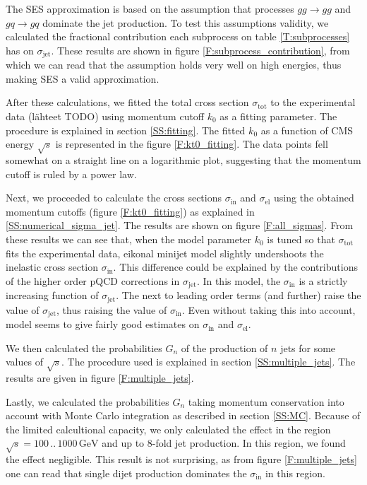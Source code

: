 \documentclass[a4paper, twoside, english, 12pt]{article}
\begin{document}
The SES approximation is based on the assumption that processes $gg\rightarrow gg$ and $gq\rightarrow gq$ dominate the jet production. To test this assumptions validity, we calculated the fractional contribution each subprocess on table \ref{T:subprocesses} has on $\sigma_{\text{jet}}$. These results are shown in figure \ref{F:subprocess_contribution}, from which we can read that the assumption holds very well on high energies, thus making SES a valid approximation.

After these calculations, we fitted the total cross section $\sigma_{\text{tot}}$ to the experimental data (lähteet TODO) using momentum cutoff $k_0$ as a fitting parameter. The procedure is explained in section \ref{SS:fitting}. The fitted $k_0$ as a function of CMS energy $\sqrt{s}$ is represented in the figure \ref{F:kt0_fitting}. The data points fell somewhat on a straight line on a logarithmic plot, suggesting that the momentum cutoff is ruled by a power law.

Next, we proceeded to calculate the cross sections $\sigma_{\text{in}}$ and $\sigma_{\text{el}}$ using the obtained momentum cutoffs (figure \ref{F:kt0_fitting}) as explained in \ref{SS:numerical_sigma_jet}. The results are shown on figure \ref{F:all_sigmas}. From these results we can see that, when the model parameter $k_0$ is tuned so that $\sigma_{\text{tot}}$ fits the experimental data, eikonal minijet model slightly undershoots the inelastic cross section $\sigma_{\text{in}}$. This difference could be explained by the contributions of the higher order pQCD corrections in $\sigma_{\text{jet}}$. In this model, the  $\sigma_{\text{in}}$ is a strictly increasing function of  $\sigma_{\text{jet}}$. The next to leading order terms (and further) raise the value of $\sigma_{\text{jet}}$, thus raising the value of $\sigma_{\text{in}}$. Even without taking this into account, model seems to give fairly good estimates on $\sigma_{\text{in}}$ and  $\sigma_{\text{el}}$.

We then calculated the probabilities $G_n$ of the production of $n$ jets for some values of $\sqrt{s}$. The procedure used is explained in section \ref{SS:multiple_jets}. The results are given in figure \ref{F:multiple_jets}.

Lastly, we calculated the probabilities $G_n$ taking momentum conservation into account with Monte Carlo integration as described in section \ref{SS:MC}. Because of the limited calcultional capacity, we only calculated the effect in the region $\sqrt{s}=100\,..\,1000\,\text{GeV}$ and up to 8-fold jet production. In this region, we found the effect negligible. This result is not surprising, as from figure \ref{F:multiple_jets} one can read that single dijet production dominates the $\sigma_{\text{in}}$ in this region.
\end{document}
